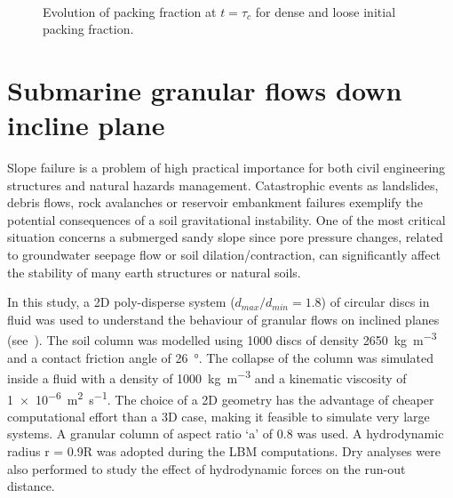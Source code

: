 \begin{figure}
\centering
{}\\
\caption{Evolution of packing fraction at $t = \tau_c$ for dense and loose 
initial packing fraction.}
\label{fig:Dense_Loose_voro}
\end{figure}

\clearpage


\section{Submarine granular flows down incline plane}

Slope failure is a problem of high practical importance for both civil 
engineering structures and natural hazards management. Catastrophic events as 
landslides, debris flows, rock avalanches or reservoir embankment failures 
exemplify the potential consequences of a soil gravitational instability. One 
of the most critical situation concerns a submerged sandy slope since pore 
pressure changes, related to groundwater seepage flow or soil 
dilation/contraction, can significantly affect the stability of many earth 
structures or natural soils.

In this study, a 2D poly-disperse system ($d_{max}/d_{min} = 1.8$) of circular 
discs in fluid was used to understand the behaviour of granular flows on 
inclined planes (see~). The soil column was modelled using 1000 
discs of density \SI{2650}{\kg\per\cubic\meter} and a contact friction angle of 
\SI{26}{\degree}. The collapse of the column was simulated inside a fluid with 
a density of \SI{1000}{\kg\per\cubic\meter}  and a kinematic viscosity of 
\SI{1e-6}{\square\meter\per\second}. The choice of a 2D geometry has the 
advantage of cheaper computational effort than a 3D case, making it feasible to 
simulate very large systems. A granular column of aspect ratio `a' of 0.8 was 
used. A hydrodynamic radius r = 0.9R was adopted during the LBM computations. 
Dry analyses were also performed to study the effect of hydrodynamic forces on 
the run-out distance.


